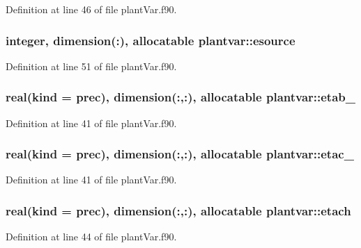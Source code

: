 Definition at line 46 of file plant\-Var.\-f90.

\hypertarget{classplantvar_ac5590ecfa29690829feb06fd8c1eb839}{
\subsubsection[{esource}]{\setlength{\rightskip}{0pt plus 5cm}integer, dimension(\-:), allocatable plantvar\-::esource}}\label{classplantvar_ac5590ecfa29690829feb06fd8c1eb839}


Definition at line 51 of file plant\-Var.\-f90.

\hypertarget{classplantvar_a4307773fae45ef7c05c590189ae40c32}{
\subsubsection[{etab\-\_\-}]{\setlength{\rightskip}{0pt plus 5cm}real(kind = prec), dimension(\-:,\-:), allocatable plantvar\-::etab\-\_\-}}\label{classplantvar_a4307773fae45ef7c05c590189ae40c32}


Definition at line 41 of file plant\-Var.\-f90.

\hypertarget{classplantvar_ab3e228857f49d79572bc7071e650ae33}{
\subsubsection[{etac\-\_\-}]{\setlength{\rightskip}{0pt plus 5cm}real(kind = prec), dimension(\-:,\-:), allocatable plantvar\-::etac\-\_\-}}\label{classplantvar_ab3e228857f49d79572bc7071e650ae33}


Definition at line 41 of file plant\-Var.\-f90.

\hypertarget{classplantvar_a1bae392336fb8d7f0376c7e98163003e}{
\subsubsection[{etach}]{\setlength{\rightskip}{0pt plus 5cm}real(kind = prec), dimension(\-:,\-:), allocatable plantvar\-::etach}}\label{classplantvar_a1bae392336fb8d7f0376c7e98163003e}


Definition at line 44 of file plant\-Var.\-f90.

